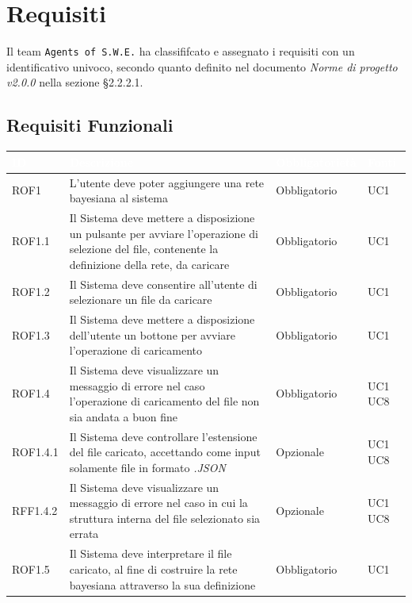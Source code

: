 \section{Requisiti}\label{Requisiti}

Il team \texttt{Agents of S.W.E.} ha classififcato e assegnato i requisiti con un identificativo univoco, secondo quanto definito nel documento \textit{Norme di progetto v2.0.0} nella sezione §2.2.2.1.

\subsection{Requisiti Funzionali}\label{RF}
\begin{center}
\begin{longtable}[c]{|m{}|m{}|m{}|m{}|}
\hline
\rowcolor{bluelogo}\textbf{\textcolor{white}{ID}} & \textbf{\textcolor{white}{Descrizione}} & \textbf{\textcolor{white}{Obbligatorietà}} & \textbf{\textcolor{white}{Fonti}}\\
\hline \hline
\endhead
ROF1 & L'utente deve poter aggiungere una rete bayesiana al sistema & Obbligatorio & UC1\\
\hline
\rowcolor{grigio}ROF1.1 & Il Sistema deve mettere a disposizione un pulsante per avviare l'operazione di selezione del file, contenente la definizione della rete, da caricare & Obbligatorio & UC1\\
\hline
ROF1.2 & Il Sistema deve consentire all'utente di selezionare un file da caricare & Obbligatorio & UC1\\
\hline
\rowcolor{grigio}ROF1.3 & Il Sistema deve mettere a disposizione dell'utente un bottone per avviare l'operazione di caricamento & Obbligatorio & UC1\\
\hline
ROF1.4 & Il Sistema deve visualizzare un messaggio di errore nel caso l'operazione di caricamento del file non sia andata a buon fine & Obbligatorio & UC1 UC8\\
\hline
\rowcolor{grigio}ROF1.4.1 & Il Sistema deve controllare l'estensione del file caricato, accettando come input solamente file in formato \textit{.JSON} & Opzionale & UC1 UC8\\
\hline
RFF1.4.2 & Il Sistema deve visualizzare un messaggio di errore nel caso in cui la struttura interna del file selezionato sia errata & Opzionale & UC1 UC8\\
\hline
\rowcolor{grigio}ROF1.5 & Il Sistema deve interpretare il file caricato, al fine di costruire la rete bayesiana attraverso la sua definizione & Obbligatorio & UC1\\

\end{longtable}
\end{center}
